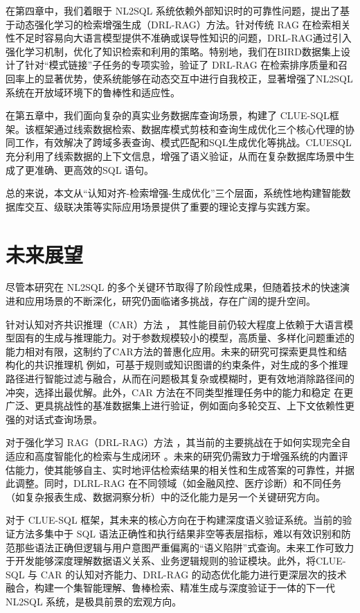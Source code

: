 \documentclass[12pt,a4paper,openright,UTF8]{ctexbook}
\begin{document}
在第四章中，我们着眼于 NL2SQL 系统依赖外部知识时的可靠性问题，提出了基于动态强化学习的检索增强生成（DRL-RAG）方法。针对传统 RAG 在检索相关性不足时容易向大语言模型提供不准确或误导性知识的问题，DRL-RAG通过引入强化学习机制，优化了知识检索和利用的策略。特别地，我们在BIRD数据集上设计了针对“模式链接”子任务的专项实验，验证了 DRL-RAG 在检索排序质量和召回率上的显著优势，使系统能够在动态交互中进行自我校正，显著增强了NL2SQL 系统在开放域环境下的鲁棒性和适应性。


在第五章中，我们面向复杂的真实业务数据库查询场景，构建了 CLUE-SQL框架。该框架通过线索数据检索、数据库模式剪枝和查询生成优化三个核心代理的协同工作，有效解决了跨域多表查询、模式匹配和SQL生成优化等挑战。CLUESQL 充分利用了线索数据的上下文信息，增强了语义验证，从而在复杂数据库场景中生成了更准确、更高效的SQL 语句。


总的来说，本文从“认知对齐-检索增强-生成优化”三个层面，系统性地构建智能数据库交互、级联决策等实际应用场景提供了重要的理论支撑与实践方案。

\section{未来展望}

尽管本研究在 NL2SQL 的多个关键环节取得了阶段性成果，但随着技术的快速演进和应用场景的不断深化，研究仍面临诸多挑战，存在广阔的提升空间。


针对认知对齐共识推理（CAR）方法 ， 其性能目前仍较大程度上依赖于大语言模型固有的生成与推理能力。对于参数规模较小的模型，高质量、多样化问题重述的能力相对有限，这制约了CAR方法的普惠化应用。未来的研究可探索更具性和结构化的共识推理机 例如，可基于规则或知识图谱的约束条件，对生成的多个推理路径进行智能过滤与融合，从而在问题极其复杂或模糊时，更有效地消除路径间的冲突，选择出最优解。此外，CAR 方法在不同类型推理任务中的能力和稳定 在更广泛、更具挑战性的基准数据集上进行验证，例如面向多轮交互、上下文依赖性更强的对话式查询场景。


对于强化学习 RAG（DRL-RAG）方法 ，其当前的主要挑战在于如何实现完全自适应和高度智能化的检索与生成闭环 。未来的研究仍需致力于增强系统的内置评估能力，使其能够自主、实时地评估检索结果的相关性和生成答案的可靠性，并据此调整。同时，DLRL-RAG 在不同领域（如金融风控、医疗诊断）和不同任务（如复杂报表生成、数据洞察分析）中的泛化能力是另一个关键研究方向。


对于 CLUE-SQL 框架，其未来的核心方向在于构建深度语义验证系统。当前的验证方法多集中于 SQL 语法正确性和执行结果非空等表层指标，难以有效识别和防范那些语法正确但逻辑与用户意图严重偏离的“语义陷阱”式查询。未来工作可致力于开发能够深度理解数据语义关系、业务逻辑规则的验证模块。此外，将CLUE-SQL 与 CAR 的认知对齐能力、DRL-RAG 的动态优化能力进行更深层次的技术融合，构建一个集智能理解、鲁棒检索、精准生成与深度验证于一体的下一代NL2SQL 系统，是极具前景的宏观方向。
\end{document}
